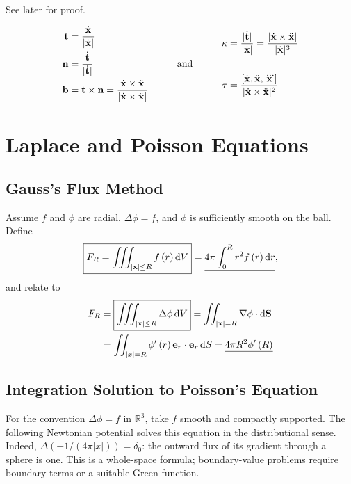 \documentclass{article}
\theoremstyle{definition}
\theoremstyle{remark}
\DeclarePairedDelimiter{\abs}{\lvert}{\rvert}
\newcommand{\qand}{\quad\text{and}\quad}
\newcommand{\qq}[1]{\quad\text{#1}\quad}
\newcommand{\grad}{\nabla}
\newcommand{\laplacian}{\Delta}
\newcommand{\cross}{\times}
\newcommand{\vdot}{\cdot}
\newcommand{\oiint}{\iint}
\begin{document}
See later for proof.

\[
    \begin{aligned}
        \vb{t} &= \frac{\dot{\vb{x}}}{\abs{\dot{\vb{x}}}} \\
        \vb{n} &= \frac{\dot{\vb{t}}}{\abs{\dot{\vb{t}}}} \\
        \vb{b} &= \vb{t} \cross \vb{n} = \frac{\dot{\vb{x}} \cross \ddot{\vb{x}}}{\abs{\dot{\vb{x}} \cross \ddot{\vb{x}}}}
    \end{aligned}
    \qq{\qq{\qand}}
    \begin{aligned}
        \kappa &= \frac{\abs{\dot{\vb{t}}}}{\abs{\dot{\vb{x}}}} = \frac{\abs{\dot{\vb{x}} \cross \ddot{\vb{x}}}}{\abs{\dot{\vb{x}}}^3} \\ \\
        \tau &= \frac{\bqty{\dot{\vb{x}}, \ddot{\vb{x}}, \dddot{\vb{x}}}}{\abs{\dot{\vb{x}} \cross \ddot{\vb{x}}}^2}
    \end{aligned}
\]

\section*{Laplace and Poisson Equations}

\subsection*{Gauss's Flux Method}

Assume $f$ and $\phi$ are radial, $\Delta\phi=f$, and $\phi$ is sufficiently smooth on the ball. Define
\[
    \boxed{F_R = \iiint_{\abs{\vb{x}} \leq R} f\pqty{r} \dd{V}} = \underline{4 \pi \int_0^R r^2 f\pqty{r} \dd{r}},
\]
and relate to
\begin{align*}
    F_R &= \boxed{\iiint_{\abs{\vb{x}} \leq R} \laplacian \phi \dd{V}} = \oiint_{\abs{\vb{x}} = R} \grad \phi \vdot \dd{\vb{S}} \\
    &= \iint_{\abs{x} = R} \phi' \pqty{r} \vb{e}_r \vdot \vb{e}_r \dd{S} = \underline{4 \pi R^2 \phi' \pqty{R}}
\end{align*}

\subsection*{Integration Solution to Poisson's Equation}

For the convention $\Delta\phi=f$ in $\mathbb R^3$, take $f$ smooth and compactly supported. The following Newtonian potential solves this equation in the distributional sense. Indeed, $\Delta(-1/(4\pi|x|))=\delta_0$: the outward flux of its gradient through a sphere is one. This is a whole-space formula; boundary-value problems require boundary terms or a suitable Green function.
\end{document}
